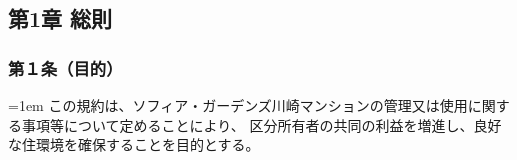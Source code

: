 \documentclass[
  luatex,
  paper=a4paper,
  fontsize=11pt,
  jafontsize=11pt,
  jlreq_notes,
]{jlreq}
\newcommand{\joumain}[1]{%
  \noindent\hangindent=1em\hangafter=1
  \hspace{1em}#1%
}
\begin{document}
  \begin{center}
    \subsection*{第1章 総則}
  \end{center}

  \subsubsection*{第１条（目的）}
  \joumain{この規約は、ソフィア・ガーデンズ川崎マンションの管理又は使用に関する事項等について定めることにより、
  区分所有者の共同の利益を増進し、良好な住環境を確保することを目的とする。}
\end{document}
